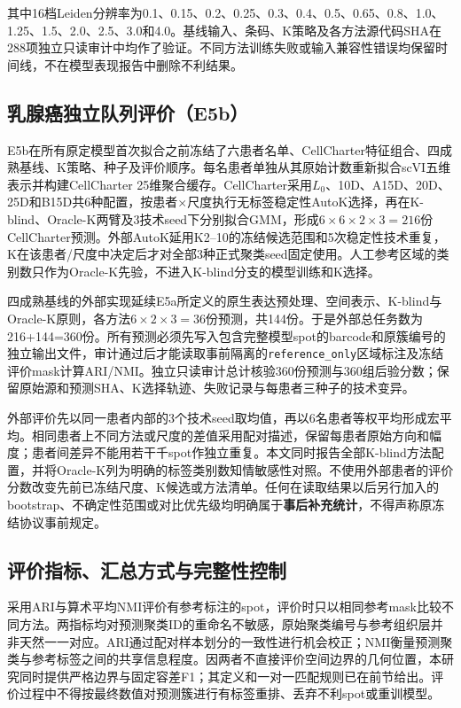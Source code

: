 其中16档Leiden分辨率为0.1、0.15、0.2、0.25、0.3、0.4、0.5、0.65、0.8、1.0、1.25、1.5、2.0、2.5、3.0和4.0。基线输入、条码、K策略及各方法源代码SHA在288项独立只读审计中均作了验证。不同方法训练失败或输入兼容性错误均保留时间线，不在模型表现报告中删除不利结果。

\subsection{乳腺癌独立队列评价（E5b）}
\label{subsec:cc-e5b-v1}

E5b在所有原定模型首次拟合之前冻结了六患者名单、CellCharter特征组合、四成熟基线、K策略、种子及评价顺序。每名患者单独从其原始计数重新拟合scVI五维表示并构建CellCharter 25维聚合缓存。CellCharter采用$L_0$、10D、A15D、20D、25D和B15D共6种配置，按患者$\times$尺度执行无标签稳定性AutoK选择，再在K-blind、Oracle-K两臂及3技术seed下分别拟合GMM，形成$6\times6\times2\times3=216$份CellCharter预测。外部AutoK延用K2--10的冻结候选范围和5次稳定性技术重复，K在该患者/尺度中决定后才对全部3种正式聚类seed固定使用。人工参考区域的类别数只作为Oracle-K先验，不进入K-blind分支的模型训练和K选择。

四成熟基线的外部实现延续E5a所定义的原生表达预处理、空间表示、K-blind与Oracle-K原则，各方法$6\times2\times3=36$份预测，共144份。于是外部总任务数为216+144=360份。所有预测必须先写入包含完整模型spot的barcode和原簇编号的独立输出文件，审计通过后才能读取事前隔离的\texttt{reference\_only}区域标注及冻结评价mask计算ARI/NMI。独立只读审计总计核验360份预测与360组后验分数；保留原始源和预测SHA、K选择轨迹、失败记录与每患者三种子的技术变异。

外部评价先以同一患者内部的3个技术seed取均值，再以6名患者等权平均形成宏平均。相同患者上不同方法或尺度的差值采用配对描述，保留每患者原始方向和幅度；患者间差异不能用若干千spot作独立重复。本文同时报告全部K-blind方法配置，并将Oracle-K列为明确的标签类别数知情敏感性对照。不使用外部患者的评价分数改变先前已冻结尺度、K候选或方法清单。任何在读取结果以后另行加入的bootstrap、不确定性范围或对比优先级均明确属于\textbf{事后补充统计}，不得声称原冻结协议事前规定。

\subsection{评价指标、汇总方式与完整性控制}
\label{subsec:cc-metrics-v1}

采用ARI与算术平均NMI评价有参考标注的spot，评价时只以相同参考mask比较不同方法。两指标均对预测聚类ID的重命名不敏感，原始聚类编号与参考组织层并非天然一一对应。ARI通过配对样本划分的一致性进行机会校正；NMI衡量预测聚类与参考标签之间的共享信息程度。因两者不直接评价空间边界的几何位置，本研究同时提供严格边界与固定容差F1；其定义和一对一匹配规则已在前节给出。评价过程中不得按最终数值对预测簇进行有标签重排、丢弃不利spot或重训模型。

